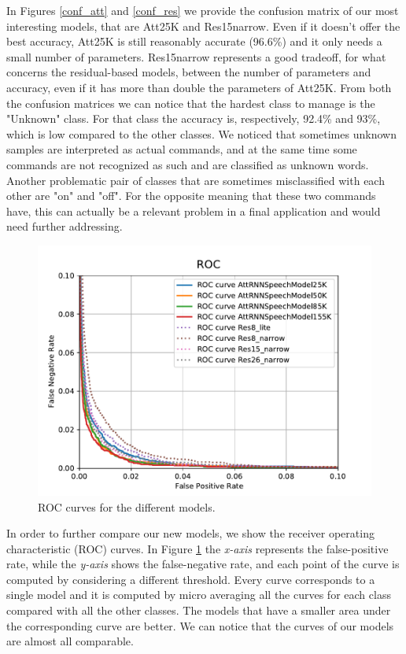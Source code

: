 In Figures \ref{conf_att} and \ref{conf_res} we provide the confusion matrix of our most interesting models, that are Att25K and Res15narrow. Even if it doesn't offer the best accuracy, Att25K is still reasonably accurate (96.6\%) and it only needs a small number of parameters.
Res15narrow represents a good tradeoff, for what concerns the residual-based models, between the number of parameters and accuracy, even if it has more than double the parameters of Att25K.
From both the confusion matrices we can notice that the hardest class to manage is the "Unknown" class.
For that class the accuracy is, respectively, 92.4\% and 93\%, which is low compared to the other classes. We noticed that sometimes unknown samples are interpreted as actual commands, and at the same time some commands are not recognized as such and are classified as unknown words. Another problematic pair of classes that are sometimes misclassified with each other are "on" and "off". For the opposite meaning that these two commands have, this can actually be a relevant problem in a final application and would need further addressing.


\begin{figure}[htbp]
\centerline{\includegraphics[scale=.5]{ROC.pdf}}
\caption{ROC curves for the different models.}
\label{roc}
\end{figure}

In order to further compare our new models, we show the receiver operating characteristic (ROC) curves. In Figure \ref{roc} the \textit{x-axis} represents the false-positive rate, while the \textit{y-axis} shows the false-negative rate, and each point of the curve is computed by considering a different threshold. Every curve corresponds to a single model and it is computed by micro averaging all the curves for each class compared with all the other classes. The models that have a smaller area under the corresponding curve are better. We can notice that the curves of our models are almost all comparable.

